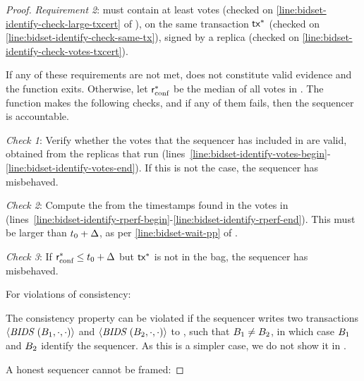 \begin{proof}
    \emph{Requirement 2}: \txcert must contain at least \alpha votes (checked on \cref{line:bidset-identify-check-large-txcert} of ), on the same transaction $\textsf{tx}^*$ (checked on \cref{line:bidset-identify-check-same-tx}), signed by a \podInst replica (checked on \cref{line:bidset-identify-check-votes-txcert}).

    If any of these requirements are not met, \tran does not constitute valid evidence and the function exits. Otherwise, let $\textsf{r}_\text{conf}^*$ be the median of all votes in \txcert. The function makes the following checks, and if any of them fails, then the sequencer is accountable.

    \emph{Check 1}: Verify whether the votes that the sequencer has included in \bidcert are valid, obtained from the replicas that run \podInst (lines~\ref{line:bidset-identify-votes-begin}-\ref{line:bidset-identify-votes-end}). If this is not the case, the sequencer has misbehaved.

    \emph{Check 2}: Compute the \rperf from the timestamps found in the votes in \bidcert (lines~\ref{line:bidset-identify-rperf-begin}-\ref{line:bidset-identify-rperf-end}). This \rperf must be larger than $t_0 + \Delta$, as per \cref{line:bidset-wait-pp} of .

    \emph{Check 3}: If $\textsf{r}_\text{conf}^* \leq t_0+\Delta$ but $\textsf{tx}^*$ is not in the bag, the sequencer has misbehaved.

     For violations of consistency:

    \noindent
    The consistency property can be violated if the sequencer writes two transactions $\msgbidresult{(\bag_1, \cdot, \cdot)}$ and $\msgbidresult{(\bag_2, \cdot,\cdot)}$ to \podInst, such that $B_1 \neq B_2$, in which case $B_1$ and $B_2$ identify the sequencer. As this is a simpler case, we do not show it in .

     A honest sequencer cannot be framed:


\end{proof}
